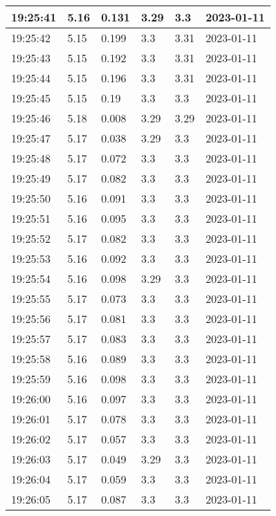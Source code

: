 \begin{longtable}{|l|l|l|l|l|l|}
        19:25:41 & 5.16 & 0.131 & 3.29 & 3.3 & 2023-01-11 \\ \hline
        19:25:42 & 5.15 & 0.199 & 3.3 & 3.31 & 2023-01-11 \\ \hline
        19:25:43 & 5.15 & 0.192 & 3.3 & 3.31 & 2023-01-11 \\ \hline
        19:25:44 & 5.15 & 0.196 & 3.3 & 3.31 & 2023-01-11 \\ \hline
        19:25:45 & 5.15 & 0.19 & 3.3 & 3.3 & 2023-01-11 \\ \hline
        19:25:46 & 5.18 & 0.008 & 3.29 & 3.29 & 2023-01-11 \\ \hline
        19:25:47 & 5.17 & 0.038 & 3.29 & 3.3 & 2023-01-11 \\ \hline
        19:25:48 & 5.17 & 0.072 & 3.3 & 3.3 & 2023-01-11 \\ \hline
        19:25:49 & 5.17 & 0.082 & 3.3 & 3.3 & 2023-01-11 \\ \hline
        19:25:50 & 5.16 & 0.091 & 3.3 & 3.3 & 2023-01-11 \\ \hline
        19:25:51 & 5.16 & 0.095 & 3.3 & 3.3 & 2023-01-11 \\ \hline
        19:25:52 & 5.17 & 0.082 & 3.3 & 3.3 & 2023-01-11 \\ \hline
        19:25:53 & 5.16 & 0.092 & 3.3 & 3.3 & 2023-01-11 \\ \hline
        19:25:54 & 5.16 & 0.098 & 3.29 & 3.3 & 2023-01-11 \\ \hline
        19:25:55 & 5.17 & 0.073 & 3.3 & 3.3 & 2023-01-11 \\ \hline
        19:25:56 & 5.17 & 0.081 & 3.3 & 3.3 & 2023-01-11 \\ \hline
        19:25:57 & 5.17 & 0.083 & 3.3 & 3.3 & 2023-01-11 \\ \hline
        19:25:58 & 5.16 & 0.089 & 3.3 & 3.3 & 2023-01-11 \\ \hline
        19:25:59 & 5.16 & 0.098 & 3.3 & 3.3 & 2023-01-11 \\ \hline
        19:26:00 & 5.16 & 0.097 & 3.3 & 3.3 & 2023-01-11 \\ \hline
        19:26:01 & 5.17 & 0.078 & 3.3 & 3.3 & 2023-01-11 \\ \hline
        19:26:02 & 5.17 & 0.057 & 3.3 & 3.3 & 2023-01-11 \\ \hline
        19:26:03 & 5.17 & 0.049 & 3.29 & 3.3 & 2023-01-11 \\ \hline
        19:26:04 & 5.17 & 0.059 & 3.3 & 3.3 & 2023-01-11 \\ \hline
        19:26:05 & 5.17 & 0.087 & 3.3 & 3.3 & 2023-01-11 \\ \hline

\end{longtable}
